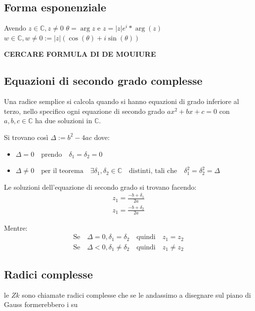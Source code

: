 \documentclass{article}
\begin{document}
\subsection{Forma esponenziale}
Avendo $z \in \mathbb{C}, z \not = 0$ \newline
$\theta = \arg z$ e  $z = | z | e^i*\arg(z)$ \newline
$w \in \mathbb{C}, w \not = 0 := |z| (\cos(\theta) + i\sin(\theta))$ \newline

\textbf{CERCARE FORMULA DI DE MOUIURE}


\subsection{Equazioni di secondo grado complesse}
Una radice semplice si calcola quando si hanno equazioni di grado inferiore al terzo, nello specifico ogni equazione di secondo grado $ax^2+bx+c = 0$ con $a,b,c \in \mathbb{C}$ ha due soluzioni in $\mathbb{C}$. \par
Si trovano così  $\Delta := b^2 - 4ac$ dove:
\begin{itemize}
        \item $\Delta = 0 \quad \mbox{prendo} \quad \delta_1 = \delta_2 = 0$	
        \item $\Delta \not = 0 \quad \mbox{per il teorema} \quad \exists \delta_1,\delta_2 \in \mathbb{C} \quad \mbox{distinti, tali che} \quad \delta_1^2 = \delta_2^2 = \Delta$	
\end{itemize}

Le soluzioni dell'equazione di secondo grado si trovano facendo:
\begin{align}
        z_1 = \frac{-b + \delta_1}{2a} \\
        z_1 = \frac{-b + \delta_2}{2a} 
\end{align}

Mentre:
\begin{align}
        \mbox{Se} \quad \Delta = 0, \delta_1=\delta_2 \quad \mbox{quindi} \quad z_1=z_2 \\
        \mbox{Se} \quad \Delta < 0, \delta_1 \not = \delta_2 \quad \mbox{quindi} \quad z_1 \not = z_2 
\end{align}


\subsection{Radici complesse}
le $Zk$ sono chiamate radici complesse che se le andassimo a disegnare sul piano di Gauss formerebbero i su \newline
\end{document}

